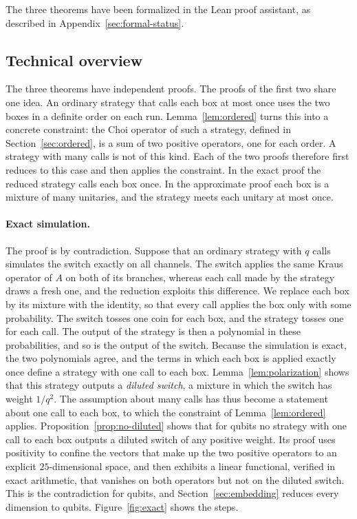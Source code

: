 \documentclass[11pt,letterpaper]{article}
\theoremstyle{definition}\newtheorem{definition}[theorem]{Definition}
\newcommand{\reffig}[1]{Figure~\ref{#1}}
\begin{document}
The three theorems have been formalized in the Lean proof assistant, as
described in Appendix~\ref{sec:formal-status}.

\subsection{Technical overview}\label{sec:overview}

The three theorems have independent proofs. The proofs of the first two
share one idea. An ordinary strategy that calls each box at most once
uses the two boxes in a definite order on each run.
Lemma~\ref{lem:ordered} turns this into a concrete constraint: the Choi
operator of such a strategy, defined in Section~\ref{sec:ordered}, is a
sum of two positive operators, one for each order. A strategy with many
calls is not of this kind. Each of the two proofs therefore first
reduces to this case and then applies the constraint. In the exact
proof the reduced strategy calls each box once. In the approximate
proof each box is a mixture of many unitaries, and the strategy meets
each unitary at most once.

\paragraph{Exact simulation.}
The proof is by contradiction. Suppose that an ordinary strategy with
$q$ calls simulates the switch exactly on all channels. The switch
applies the same Kraus operator of $A$ on both of its branches, whereas
each call made by the strategy draws a fresh one, and the reduction
exploits this difference. We replace each box by its mixture with the
identity, so that every call applies the box only with some
probability. The switch tosses one coin for each box, and the strategy
tosses one for each call. The output of the strategy is then a polynomial in these
probabilities, and so is the output of the switch. Because the
simulation is exact, the two polynomials agree, and the terms in which
each box is applied exactly once define a strategy with one call to
each box. Lemma~\ref{lem:polarization} shows that this strategy outputs
a \emph{diluted switch}, a mixture in which the switch has weight
$1/q^2$. The assumption about many calls has thus become a
statement about one call to each box, to which the constraint of
Lemma~\ref{lem:ordered} applies. Proposition~\ref{prop:no-diluted}
shows that for qubits no strategy with one call to each box outputs a
diluted switch of any positive weight. Its proof uses positivity to
confine the vectors that make up the two positive operators to an
explicit $25$-dimensional space, and then exhibits a linear functional, verified in exact
arithmetic, that vanishes on both operators but not on the diluted
switch. This is the contradiction for qubits, and
Section~\ref{sec:embedding} reduces every dimension to qubits.
\reffig{fig:exact} shows the steps.
\end{document}
